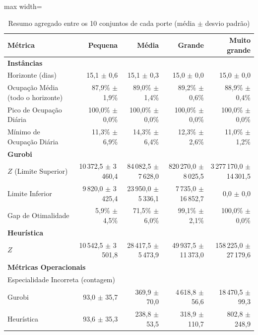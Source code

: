 \begin{table}[htbp]
    \caption{Resumo agregado entre os 10 conjuntos de cada porte (média $\pm$ desvio padrão)}
    \label{tab:agregado}
    \centering
    \begin{adjustbox}{max width=\textwidth}
    \begin{tabular}{lrrrr}
        \hline
        \textbf{Métrica} & \textbf{Pequena} & \textbf{Média} & \textbf{Grande} & \textbf{Muito grande} \\
        \hline
        \multicolumn{5}{l}{\textbf{Instâncias}} \\
        Horizonte (dias) & 15,1 $\pm$ 0,6 & 15,1 $\pm$ 0,3 & 15,0 $\pm$ 0,0 & 15,0 $\pm$ 0,0 \\
        Ocupação Média (todo o horizonte) & 87,9\% $\pm$ 1,9\% & 89,0\% $\pm$ 1,4\% & 89,2\% $\pm$ 0,6\% & 88,9\% $\pm$ 0,4\% \\
        Pico de Ocupação Diária & 100,0\% $\pm$ 0,0\% & 100,0\% $\pm$ 0,0\% & 100,0\% $\pm$ 0,0\% & 100,0\% $\pm$ 0,0\% \\
        Mínimo de Ocupação Diária & 11,3\% $\pm$ 6,9\% & 14,3\% $\pm$ 6,4\% & 12,3\% $\pm$ 2,6\% & 11,0\% $\pm$ 1,2\% \\
        \hline
        \multicolumn{5}{l}{\textbf{Gurobi}} \\
        $Z$ (Limite Superior) & 10\,372,5 $\pm$ 3\,460,4 & 84\,082,5 $\pm$ 7\,628,0 & 820\,270,0 $\pm$ 8\,025,5 & 3\,277\,170,0 $\pm$ 14\,301,5 \\
        Limite Inferior & 9\,820,0 $\pm$ 3\,425,4 & 23\,950,0 $\pm$ 5\,336,1 & 7\,735,0 $\pm$ 16\,852,7 & 0,0 $\pm$ 0,0 \\
        Gap de Otimalidade & 5,9\% $\pm$ 4,5\% & 71,5\% $\pm$ 6,0\% & 99,1\% $\pm$ 2,1\% & 100,0\% $\pm$ 0,0\% \\
        \hline
        \multicolumn{5}{l}{\textbf{Heurística}} \\
        $Z$ & 10\,542,5 $\pm$ 3\,501,8 & 28\,417,5 $\pm$ 5\,473,9 & 49\,937,5 $\pm$ 11\,373,0 & 158\,225,0 $\pm$ 27\,179,6 \\
        \hline
        \multicolumn{5}{l}{\textbf{Métricas Operacionais}} \\
        \multicolumn{5}{l}{Especialidade Incorreta (contagem)} \\
        \quad Gurobi & 93,0 $\pm$ 35,7 & 369,9 $\pm$ 70,0 & 4\,618,8 $\pm$ 56,6 & 18\,470,5 $\pm$ 99,3 \\
        \quad Heurística & 93,6 $\pm$ 35,3 & 238,8 $\pm$ 53,5 & 318,9 $\pm$ 110,7 & 802,8 $\pm$ 248,9 \\

\end{tabular}
\end{adjustbox}
\end{table}
